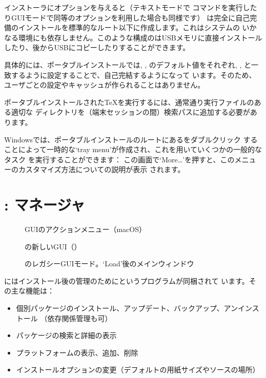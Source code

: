 \documentclass[uplatex,dvipdfmx,12pt]{jsarticle}
\begin{document}
\TL インストーラにオプションを与えると（テキストモードで%
コマンドを実行したりGUIモードで同等のオプションを利用した場合も同様です）\TL
は完全に自己完備のインストールを標準的なルート以下に作成します。これはシステムの
いかなる環境にも依存しません。このような構成の\TL はUSBメモリに直接インストール
したり、後からUSBにコピーしたりすることができます。

具体的には、ポータブルインストールでは, , のデフォルト値をそれぞれ, ,
と一致するように設定することで、自己完結するようになって
います。そのため、ユーザごとの設定やキャッシュが作られることはありません。

ポータブルインストールされた\TeX を実行するには、通常通り実行ファイルのある適切な
ディレクトリを（端末セッションの間）検索パスに追加する必要があります。

Windowsでは、ポータブルインストールのルートにあるをダブルクリック
することによって一時的な`tray menu'が作成され、これを用いていくつかの一般的なタスク
を実行することができます：
%
\medskip
{}
\smallskip
%
この画面で`More\ldots'を押すと、このメニューのカスタマイズ方法についての説明が表示
されます。

\section{: \TL マネージャ}
\label{sec:tlmgr}

\begin{figure}[tb]
\caption{ GUIのアクションメニュー（macOS）}
\label{fig:tlshell}
\end{figure}

\begin{figure}[tb]
\caption{の新しい{GUI}（）}
\label{fig:tlcockpit}
\end{figure}

\begin{figure}[tb]
\caption{のレガシーGUIモード。`Load'後のメインウィンドウ}
\label{fig:tlmgr-gui}
\end{figure}

\TL にはインストール後の\TL 管理のためにというプログラムが同梱されて
います。その主な機能は：
%
\begin{itemize}
\item 個別パッケージのインストール、アップデート、バックアップ、アンインストール
  （依存関係管理も可）
\item パッケージの検索と詳細の表示
\item プラットフォームの表示、追加、削除
\item インストールオプションの変更（デフォルトの用紙サイズやソースの場所）
\end{itemize}
\end{document}
